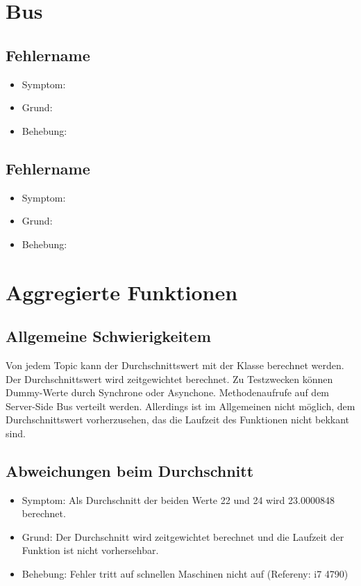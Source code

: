 \documentclass[qualitaetssicherung.tex]{subfiles}
\begin{document}
\section{Bus}

	\subsection{Fehlername}
		\begin{itemize}
			\item
			Symptom:
			\item
			Grund:
			\item
			Behebung:
		\end{itemize}
		
	\subsection{Fehlername}
		\begin{itemize}
			\item
			Symptom:
			\item
			Grund:
			\item
			Behebung:
		\end{itemize}
		
\section{Aggregierte Funktionen}

	\subsection{Allgemeine Schwierigkeitem} 
		Von jedem Topic kann der Durchschnittswert mit der Klasse \label{Class: AverageComputation} berechnet werden. Der Durchschnittswert wird zeitgewichtet berechnet. Zu Testzwecken können Dummy-Werte durch Synchrone oder Asynchone. Methodenaufrufe auf dem Server-Side Bus verteilt werden. Allerdings ist im Allgemeinen nicht möglich, dem Durchschnittswert vorherzusehen, das die Laufzeit des Funktionen nicht bekkant sind.

	\subsection{Abweichungen beim Durchschnitt}
		\begin{itemize}
			\item
			Symptom: Als Durchschnitt der beiden Werte 22 und 24 wird 23.0000848 berechnet.
			\item
			Grund: Der Durchschnitt wird zeitgewichtet berechnet und die Laufzeit der Funktion ist nicht vorhersehbar.
			\item
			Behebung: Fehler tritt auf schnellen Maschinen nicht auf (Refereny: i7 4790)

		\end{itemize}
\end{document}

